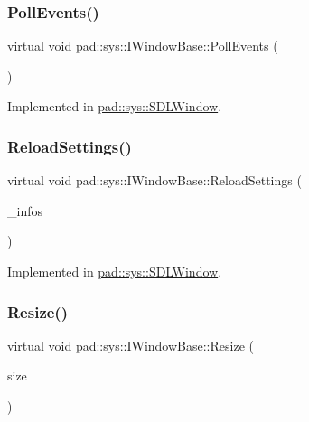\subsubsection{\texorpdfstring{Poll\+Events()}{PollEvents()}}
{\footnotesize\ttfamily virtual void pad\+::sys\+::\+I\+Window\+Base\+::\+Poll\+Events (\begin{DoxyParamCaption}{ }\end{DoxyParamCaption})\hspace{0.3cm}{\ttfamily [pure virtual]}}



Implemented in \mbox{\hyperlink{classpad_1_1sys_1_1_s_d_l_window_a66014e181e30c20a3488ff715d106665}{pad\+::sys\+::\+S\+D\+L\+Window}}.

\mbox{\label{classpad_1_1sys_1_1_i_window_base_aff693c784fbf16ae5bbfce797f570879}} 
\subsubsection{\texorpdfstring{Reload\+Settings()}{ReloadSettings()}}
{\footnotesize\ttfamily virtual void pad\+::sys\+::\+I\+Window\+Base\+::\+Reload\+Settings (\begin{DoxyParamCaption}\item[{const \mbox{\hyperlink{structpad_1_1sys_1_1_window_settings}{Window\+Settings}} \&}]{\+\_\+infos }\end{DoxyParamCaption})\hspace{0.3cm}{\ttfamily [pure virtual]}}



Implemented in \mbox{\hyperlink{classpad_1_1sys_1_1_s_d_l_window_a7f45cd8f1ffa83c4aaedf40b69012870}{pad\+::sys\+::\+S\+D\+L\+Window}}.

\mbox{\label{classpad_1_1sys_1_1_i_window_base_a19fff5f21c5a75082d8ca4e2491b269e}} 
\subsubsection{\texorpdfstring{Resize()}{Resize()}}
{\footnotesize\ttfamily virtual void pad\+::sys\+::\+I\+Window\+Base\+::\+Resize (\begin{DoxyParamCaption}\item[{const \mbox{\hyperlink{namespacepad_1_1math_a9773bcf81aa2ddd829bc327d822c6552}{math\+::\+Vec2}}$<$ \mbox{\hyperlink{namespacepad_a03b9241a5f6a191da2faac64714e1038}{uint16}} $>$ \&}]{size }\end{DoxyParamCaption})\hspace{0.3cm}{\ttfamily [pure virtual]}}



